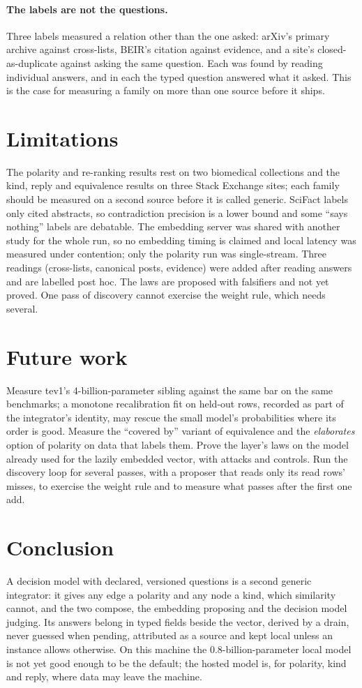 \documentclass[11pt]{article}
\theoremstyle{definition}
\theoremstyle{plain}
\theoremstyle{remark}
\begin{document}
\paragraph{The labels are not the questions.} Three labels measured a relation other than the one
asked: arXiv's primary archive against cross-lists, BEIR's citation against evidence, and a site's
closed-as-duplicate against asking the same question. Each was found by reading individual answers,
and in each the typed question answered what it asked. This is the case for measuring a family on
more than one source before it ships.

\section{Limitations}
The polarity and re-ranking results rest on two biomedical collections and the kind,
reply and equivalence results on three Stack Exchange sites; each family should be measured on a
second source before it is called generic. SciFact labels only cited abstracts, so contradiction
precision is a lower bound and some ``says nothing'' labels are debatable. The embedding server was
shared with another study for the whole run, so no embedding timing is claimed and local latency
was measured under contention; only the polarity run was single-stream. Three readings (cross-lists,
canonical posts, evidence) were added after reading answers and are labelled post hoc. The laws are
proposed with falsifiers and not yet proved. One pass of discovery cannot exercise the weight rule,
which needs several.

\section{Future work}
Measure tev1's 4-billion-parameter sibling against the same bar on the same benchmarks; a
monotone recalibration fit on held-out rows, recorded as part of the integrator's identity, may
rescue the small model's probabilities where its order is good. Measure the ``covered by'' variant
of equivalence and the \emph{elaborates} option of polarity on data that labels them. Prove the
layer's laws on the model already used for the lazily embedded vector, with attacks and controls.
Run the discovery loop for several passes, with a proposer that reads only its read rows' misses,
to exercise the weight rule and to measure what passes after the first one add.

\section{Conclusion}
A decision model with declared, versioned questions is a second generic integrator: it gives
any edge a polarity and any node a kind, which similarity cannot, and the two compose, the embedding
proposing and the decision model judging. Its answers belong in typed fields beside the vector,
derived by a drain, never guessed when pending, attributed as a source and kept local unless an
instance allows otherwise. On this machine the 0.8-billion-parameter local model is not yet good
enough to be the default; the hosted model is, for polarity, kind and reply, where data may leave
the machine.



\end{document}
